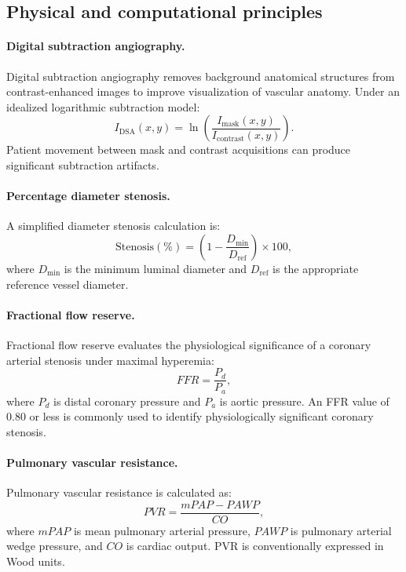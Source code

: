 \subsection{Physical and computational principles}
\paragraph{Digital subtraction angiography.} Digital subtraction angiography removes background anatomical structures from contrast-enhanced images to improve visualization of vascular anatomy. Under an idealized logarithmic subtraction model:
\begin{equation}
I_{\mathrm{DSA}}(x,y)=\ln\left(\frac{I_{\mathrm{mask}}(x,y)}{I_{\mathrm{contrast}}(x,y)}\right).
\end{equation}
Patient movement between mask and contrast acquisitions can produce significant subtraction artifacts.

\paragraph{Percentage diameter stenosis.} A simplified diameter stenosis calculation is:
\begin{equation}
\text{Stenosis}(\%)=\left(1-\frac{D_{\min}}{D_{\mathrm{ref}}}\right)\times100,
\end{equation}
where $D_{\min}$ is the minimum luminal diameter and $D_{\mathrm{ref}}$ is the appropriate reference vessel diameter.

\paragraph{Fractional flow reserve.} Fractional flow reserve evaluates the physiological significance of a coronary arterial stenosis under maximal hyperemia:
\begin{equation}
FFR=\frac{P_d}{P_a},
\end{equation}
where $P_d$ is distal coronary pressure and $P_a$ is aortic pressure. An FFR value of 0.80 or less is commonly used to identify physiologically significant coronary stenosis.

\paragraph{Pulmonary vascular resistance.} Pulmonary vascular resistance is calculated as:
\begin{equation}
PVR=\frac{mPAP-PAWP}{CO},
\end{equation}
where $mPAP$ is mean pulmonary arterial pressure, $PAWP$ is pulmonary arterial wedge pressure, and $CO$ is cardiac output. PVR is conventionally expressed in Wood units.

